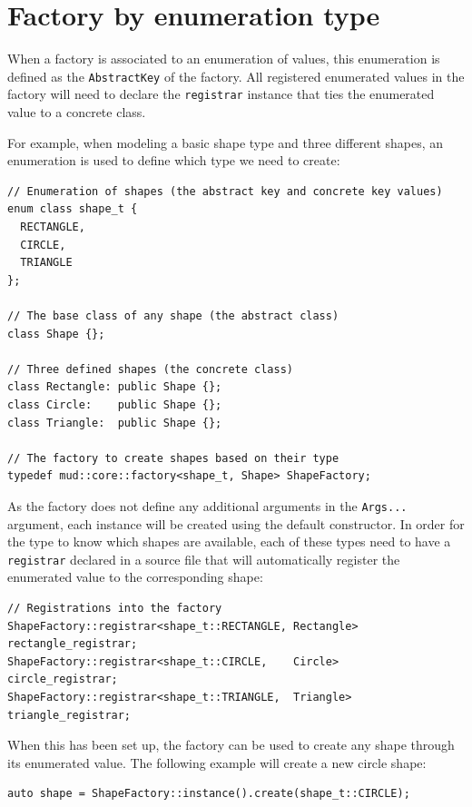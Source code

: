 \documentclass[10pt,a4paper,openany]{mudbook}
\begin{document}
\section{Factory by enumeration type}
\label{sct:factory-enumeration}

When a factory is associated to an enumeration of values, this enumeration is
defined as the \texttt{AbstractKey} of the factory. All registered enumerated
values in the factory will need to declare the \texttt{registrar} instance that
ties the enumerated value to a concrete class.

For example, when modeling a basic shape type and three different shapes, an
enumeration is used to define which type we need to create:

\begin{lstlisting}[style=snippet]
// Enumeration of shapes (the abstract key and concrete key values)
enum class shape_t {
  RECTANGLE,
  CIRCLE,
  TRIANGLE
};

// The base class of any shape (the abstract class)
class Shape {};

// Three defined shapes (the concrete class)
class Rectangle: public Shape {};
class Circle:    public Shape {};
class Triangle:  public Shape {};

// The factory to create shapes based on their type
typedef mud::core::factory<shape_t, Shape> ShapeFactory;
\end{lstlisting}

As the factory does not define any additional arguments in the \texttt{Args...}
argument, each instance will be created using the default constructor.
In order for the type to know which shapes are available, each of these types
need to have a \texttt{registrar} declared in a \Cpp source file that will
automatically register the enumerated value to the corresponding shape:

\begin{lstlisting}[style=snippet]
// Registrations into the factory
ShapeFactory::registrar<shape_t::RECTANGLE, Rectangle> rectangle_registrar;
ShapeFactory::registrar<shape_t::CIRCLE,    Circle>    circle_registrar;
ShapeFactory::registrar<shape_t::TRIANGLE,  Triangle>  triangle_registrar;
\end{lstlisting} 

When this has been set up, the factory can be used to create any shape through
its enumerated value. The following example will create a new circle shape:
\begin{lstlisting}[style=snippet]
auto shape = ShapeFactory::instance().create(shape_t::CIRCLE);
\end{lstlisting} 
\end{document}
